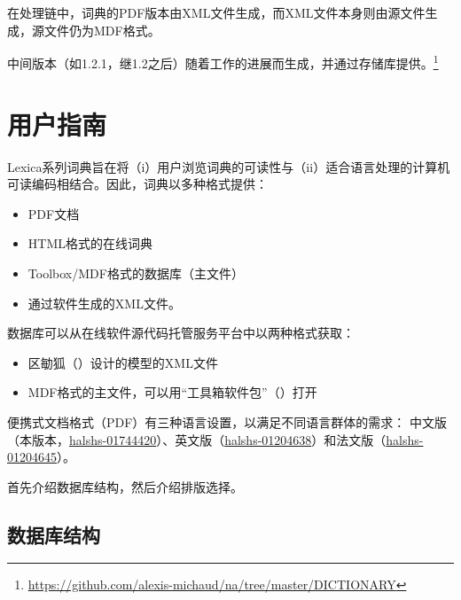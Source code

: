 在处理链中，词典的PDF版本由XML文件生成，而XML文件本身则由源文件生成，源文件仍为MDF格式。

中间版本（如1.2.1，继1.2之后）随着工作的进展而生成，并通过存储库提供。\footnote{\url{https://github.com/alexis-michaud/na/tree/master/DICTIONARY}}





\section{用户指南}
\label{sec:guide}

Lexica系列词典旨在将（i）用户浏览词典的可读性与（ii）适合语言处理的计算机可读编码相结合。因此，词典以多种格式提供：
\begin{itemize}
    \item PDF文档
    \item HTML格式的在线词典
    \item Toolbox/MDF格式的数据库（主文件）
    \item 通过软件生成的XML文件。
\end{itemize}

数据库可以从在线软件源代码托管服务平台中以两种格式获取：

\begin{itemize}
    \item 区勄狐（）设计的模型的XML文件
    \item MDF格式的主文件，可以用“工具箱软件包”（）打开
\end{itemize}

便携式文档格式（PDF）有三种语言设置，以满足不同语言群体的需求： 中文版（本版本，\href{https://shs.hal.science/halshs-01744420}{halshs-01744420}）、英文版（\href{https://shs.hal.science/halshs-01204638}{halshs-01204638}）和法文版（\href{https://shs.hal.science/halshs-01204645/}{halshs-01204645}）。

首先介绍数据库结构，然后介绍排版选择。

\subsection{数据库结构}

